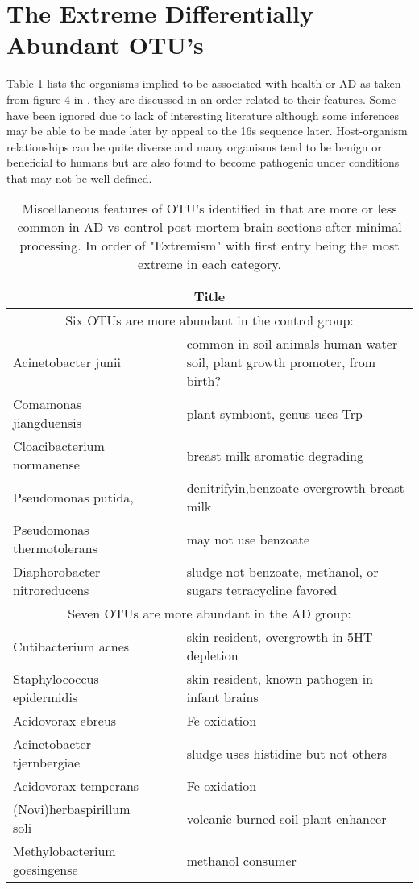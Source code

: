 \documentclass[aps,secnumarabic,balancelastpage,amsmath,amssymb,nofootinbib]{revtex4}
\newcommand{\mjmreftab}[1]{Table  \ref{tab:#1}}
\begin{document}
\section{The Extreme Differentially Abundant OTU's  }

\mjmreftab{otuextremes} lists
the organisms implied to be
associated with health or AD as  taken from figure 4 in
 \cite{10.3389/fcimb.2023.1123228} . 
they  are discussed in an order related to their  
features. Some have been ignored due to lack 
of interesting literature although some inferences may
be able to be made later by appeal to the 16s sequence later.
Host-organism relationships can be quite diverse 
and many organisms tend to be benign or beneficial to humans
but are also found to become pathogenic under conditions
that may not be well defined. 


\begin{table}[H] \centering
\begin{tabular}{|l|r|c|l|}
\hline
\multicolumn{4}{|c|}{Title}\\
\hline
\multicolumn{4}{|c|}{ Six OTUs are more abundant in the control group:  } \\
\hline
Acinetobacter junii &&& common in soil animals human water soil, plant growth promoter, from birth? \\
Comamonas jiangduensis&&& plant symbiont, genus uses Trp  \\
Cloacibacterium normanense&&& breast milk aromatic degrading \\
Pseudomonas putida,&&& denitrifyin,benzoate overgrowth  breast milk  \\
Pseudomonas thermotolerans&&& may not use benzoate \\
Diaphorobacter nitroreducens&&& sludge not benzoate, methanol,  or sugars tetracycline favored  \\
\hline
\multicolumn{4}{|c|}{ Seven OTUs are more abundant in the AD group:  } \\
\hline
Cutibacterium acnes &&& skin resident, overgrowth in 5HT depletion  \\
Staphylococcus epidermidis &&& skin resident, known pathogen in infant brains \\
Acidovorax ebreus &&& Fe oxidation \\
Acinetobacter tjernbergiae &&& sludge uses histidine but not others  \\
Acidovorax temperans&&& Fe oxidation \\
(Novi)herbaspirillum soli &&& volcanic burned soil plant enhancer  \\
Methylobacterium goesingense&&& methanol consumer \\
\hline
\end{tabular}
\caption{ Miscellaneous features of 
OTU's identified in \cite{10.3389/fcimb.2023.1123228} 
that are more or less common in AD vs control post mortem brain
sections after minimal processing. In order of "Extremism"
with first entry being the most extreme in each category. 
}
\label{tab:otuextremes}
\end{table}
\end{document}
